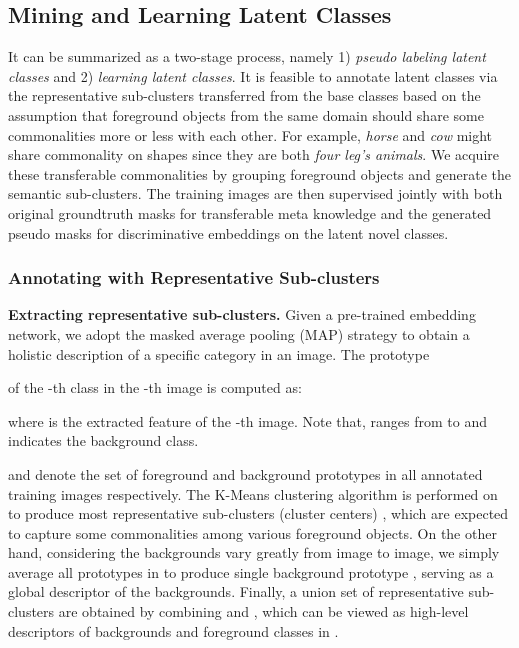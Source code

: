 \documentclass[10pt,twocolumn,letterpaper]{article}
\begin{document}
\subsection{Mining and Learning Latent Classes}
It can be summarized as a two-stage process, namely 1) \textit{pseudo labeling latent classes} and 2) \textit{learning latent classes}. It is feasible to annotate latent classes via the representative sub-clusters transferred from the base classes based on the assumption that foreground objects from the same domain should share some commonalities more or less with each other. For example, \textit{horse} and \textit{cow} might share commonality on shapes since they are both \textit {four leg's animals}. We acquire these transferable commonalities by grouping foreground objects and generate the semantic sub-clusters. The training images are then supervised jointly with both original groundtruth masks for transferable meta knowledge and the generated pseudo masks for discriminative embeddings on the latent novel classes.

\vspace{-0.15cm}
\subsubsection{Annotating with Representative Sub-clusters}

\textbf{Extracting representative sub-clusters.}  Given a pre-trained embedding network, we adopt the masked average pooling (MAP) strategy \cite{siam2019amp} to obtain a holistic description of a specific category in an image. The prototype 
 
of the -th class in the -th image is computed as:
\vspace{-0.1cm}

where  is the extracted feature of the -th image. Note that,  ranges from  to  and  indicates the background class.

 and  denote the set of foreground and background prototypes in all annotated training images respectively. The K-Means clustering algorithm is performed on  to produce  most representative sub-clusters (cluster centers) , which are expected to capture some commonalities among various foreground objects. On the other hand, considering the backgrounds vary greatly from image to image, we simply average all prototypes in  to produce single background prototype , serving as a global descriptor of the backgrounds. Finally, a union set of  representative sub-clusters  are obtained by combining  and , which can be viewed as high-level descriptors of backgrounds and foreground classes in .
\end{document}
